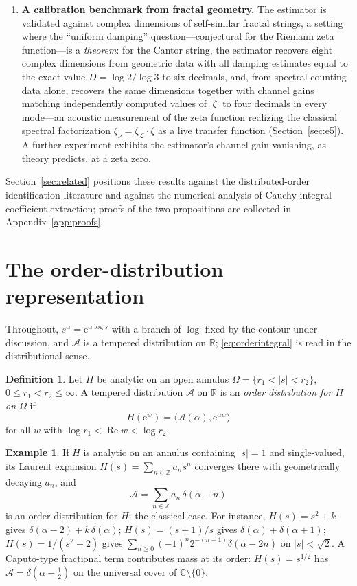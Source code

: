 \documentclass[11pt, a4paper]{article}
\theoremstyle{definition}
\newtheorem{definition}[theorem]{Definition}
\newtheorem{example}[theorem]{Example}
\theoremstyle{remark}
\newcommand{\R}{\mathbb{R}}
\newcommand{\Z}{\mathbb{Z}}
\newcommand{\C}{\mathbb{C}}
\newcommand{\ee}{\mathrm{e}}
\begin{document}
\begin{enumerate}
\item \textbf{A calibration benchmark from fractal geometry.} The estimator
is validated against complex dimensions of self-similar fractal strings, a
setting where the ``uniform damping'' question---conjectural for the
Riemann zeta function---is a \emph{theorem}: for the Cantor string, the
estimator recovers eight complex dimensions from geometric data with all
damping estimates equal to the exact value $D=\log2/\log3$ to six
decimals, and, from spectral counting data alone, recovers the same
dimensions together with channel gains matching independently computed
values of $|\zeta|$ to four decimals in every mode---an acoustic
measurement of the zeta function realizing the classical spectral
factorization $\zeta_\nu=\zeta_{\mathcal{L}}\cdot\zeta$ as a live transfer
function (Section~\ref{sec:e5}). A further experiment exhibits the
estimator's channel gain vanishing, as theory predicts, at a zeta zero.
\end{enumerate}

Section~\ref{sec:related} positions these results against the
distributed-order identification literature and against the numerical
analysis of Cauchy-integral coefficient extraction; proofs of the two
propositions are collected in Appendix~\ref{app:proofs}.

\section{The order-distribution representation}\label{sec:representation}

Throughout, $s^{\alpha}=\ee^{\alpha\log s}$ with a branch of $\log$ fixed by
the contour under discussion, and $\mathcal{A}$ is a tempered distribution
on $\R$; \eqref{eq:orderintegral} is read in the distributional sense.

\begin{definition}\label{def:orderdist}
Let $H$ be analytic on an open annulus
$\Omega=\{r_1<|s|<r_2\}$, $0\le r_1<r_2\le\infty$. A tempered distribution
$\mathcal{A}$ on $\R$ is an \emph{order distribution for $H$ on $\Omega$} if
\[
H(\ee^{w})=\big\langle \mathcal{A}(\alpha), \ee^{\alpha w}\big\rangle
\]
for all $w$ with $\log r_1<\operatorname{Re}w<\log r_2$.
\end{definition}

\begin{example}\label{ex:laurent}
If $H$ is analytic on an annulus containing $|s|=1$ and single-valued, its
Laurent expansion $H(s)=\sum_{n\in\Z}a_n s^{n}$ converges there with
geometrically decaying $a_n$, and
\[
\mathcal{A}=\sum_{n\in\Z}a_n\, \delta(\alpha-n)
\]
is an order distribution for $H$: the classical case. For instance,
$H(s)=s^{2}+k$ gives $\delta(\alpha-2)+k\, \delta(\alpha)$;
$H(s)=(s+1)/s$ gives $\delta(\alpha)+\delta(\alpha+1)$;
$H(s)=1/(s^{2}+2)$ gives $\sum_{n\ge0}(-1)^{n}2^{-(n+1)}
\delta(\alpha-2n)$ on $|s|<\sqrt2$. A Caputo-type fractional term
contributes mass at its order: $H(s)=s^{1/2}$ has
$\mathcal{A}=\delta(\alpha-\tfrac12)$ on the universal cover of
$\C\setminus\{0\}$.
\end{example}
\end{document}
